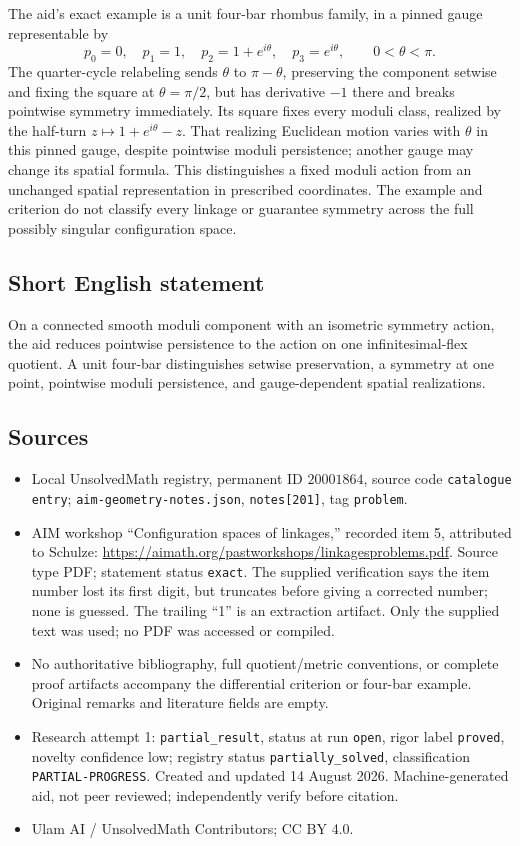 \documentclass[11pt]{article}
\begin{document}
The aid's exact example is a unit four-bar rhombus family, in a pinned gauge representable by
\[
 p_0=0,\quad p_1=1,\quad p_2=1+e^{i\theta},\quad p_3=e^{i\theta},
 \qquad0<\theta<\pi.
\]
The quarter-cycle relabeling sends \(\theta\) to \(\pi-\theta\), preserving the component setwise and fixing the square at \(\theta=\pi/2\), but has derivative \(-1\) there and breaks pointwise symmetry immediately. Its square fixes every moduli class, realized by the half-turn \(z\mapsto1+e^{i\theta}-z\). That realizing Euclidean motion varies with \(\theta\) in this pinned gauge, despite pointwise moduli persistence; another gauge may change its spatial formula. This distinguishes a fixed moduli action from an unchanged spatial representation in prescribed coordinates. The example and criterion do not classify every linkage or guarantee symmetry across the full possibly singular configuration space.
\subsection{Short English statement}
On a connected smooth moduli component with an isometric symmetry action, the aid reduces pointwise persistence to the action on one infinitesimal-flex quotient. A unit four-bar distinguishes setwise preservation, a symmetry at one point, pointwise moduli persistence, and gauge-dependent spatial realizations.
\subsection{Sources}
\begin{itemize}
\item Local UnsolvedMath registry, permanent ID \(20001864\), source code \texttt{catalogue entry}; \texttt{aim-geometry-notes.json}, \texttt{notes[201]}, tag \texttt{problem}.
\item AIM workshop ``Configuration spaces of linkages,'' recorded item 5, attributed to Schulze: \url{https://aimath.org/pastworkshops/linkagesproblems.pdf}. Source type PDF; statement status \texttt{exact}. The supplied verification says the item number lost its first digit, but truncates before giving a corrected number; none is guessed. The trailing ``1'' is an extraction artifact. Only the supplied text was used; no PDF was accessed or compiled.
\item No authoritative bibliography, full quotient/metric conventions, or complete proof artifacts accompany the differential criterion or four-bar example. Original remarks and literature fields are empty.
\item Research attempt 1: \texttt{partial\_result}, status at run \texttt{open}, rigor label \texttt{proved}, novelty confidence low; registry status \texttt{partially\_solved}, classification \texttt{PARTIAL-PROGRESS}. Created and updated 14 August 2026. Machine-generated aid, not peer reviewed; independently verify before citation.
\item Ulam AI / UnsolvedMath Contributors; CC BY 4.0.
\end{itemize}
\end{document}
